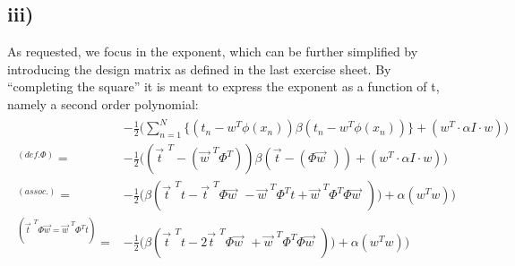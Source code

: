 \documentclass[11pt]{scrartcl} %
\begin{document}
         \subsection*{iii)}
         As requested, we focus in the exponent, which can be further simplified by introducing the design matrix as defined in the last exercise sheet. By ``completing the square'' it is meant to express the exponent as a function of t, namely a second order polynomial:
         \begin{align*}
           \begin{aligned}
             & -\frac{1}{2} \bigg( \sum_{n=1}^N\Big\{(t_n-w^T\phi(x_n))\beta (t_n-w^T\phi(x_n))\Big\} + (w^T \cdot \alpha I \cdot w)\bigg)\\
             ^{(def. \Phi)}=&-\frac{1}{2} \bigg( (\vec{t}^{\;\,T}-(\vec{w}^{\;\,T}\Phi^T)) \beta(\vec{t}-(\Phi \vec{w}\;\,))  + (w^T \cdot \alpha I \cdot w)\bigg)\\
             ^{(assoc.)}=&-\frac{1}{2} \bigg(\beta (\vec{t}^{\;\,T}t  -  \vec{t}^{\;\,T}\Phi \vec{w}\;\,  - \vec{w}^{\;\,T}\Phi^Tt +  \vec{w}^{\;\,T}\Phi^T\Phi \vec{w}\;\,))  + \alpha(w^T w)\bigg)\\
             ^{( \vec{t}^{\;\,T}\Phi \vec{w}=\vec{w}^{\;\,T}\Phi^Tt)}=&-\frac{1}{2} \bigg(\beta (\vec{t}^{\;\,T}t  -  2\vec{t}^{\;\,T}\Phi \vec{w}\;\, +  \vec{w}^{\;\,T}\Phi^T\Phi \vec{w}\;\,))  + \alpha(w^T w)\bigg)\\
           \end{aligned}
         \end{align*}
\end{document}
